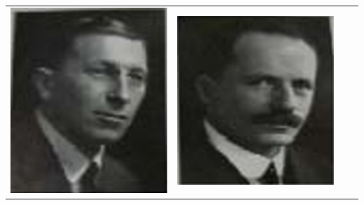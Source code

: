 \noindent
\begin{tabular}{@{}cccc@{}}
\includegraphics[scale=.62]{images/011.jpg} & 
\includegraphics[scale=.7]{images/012.jpg} &

\end{tabular}
